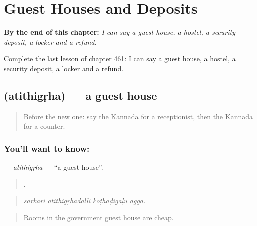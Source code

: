 
\chapter{Guest Houses and Deposits}
\label{ch:ka-guest-houses-and-deposits}

\begin{chapteropening}
\textbf{By the end of this chapter:} \emph{I can say a guest house, a hostel, a security deposit, a locker and a refund.}

Complete the last lesson of chapter 461: I can say a guest house, a hostel, a security deposit, a locker and a refund.
\end{chapteropening}

\section[\texorpdfstring{\kn{ಅತಿಥಿಗೃಹ} (atithigṛha)}{ಅತಿಥಿಗೃಹ (atithigṛha)}]{ (atithigṛha) — a guest house}

\label{lesson:KA-C461-atithigrha}



\begin{quote}
Before the new one: say the Kannada for a receptionist, then the Kannada for a counter.
\end{quote}

\subsection*{You'll want to know: }
\textbf{} — \emph{atithigṛha} — \textquotedblleft{}a guest house\textquotedblright{}.

\begin{quote}
   .
\end{quote}

\begin{quote}
\emph{sarkāri atithigṛhadalli koṭhaḍigaḷu agga.}
\end{quote}

\begin{quote}
Rooms in the government guest house are cheap.
\end{quote}

